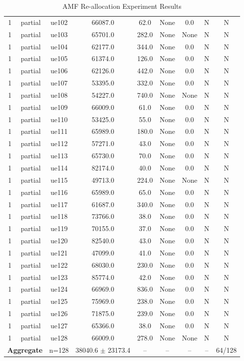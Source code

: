 \begin{table}[ht]
\begin{tabular}{|c|c|c|c|c|c|c|c|c|}
1 & partial & ue102 & 66087.0 & 62.0 & None & 0.0 & N & N \\
1 & partial & ue103 & 65701.0 & 282.0 & None & None & N & N \\
1 & partial & ue104 & 62177.0 & 344.0 & None & 0.0 & N & N \\
1 & partial & ue105 & 61374.0 & 126.0 & None & 0.0 & N & N \\
1 & partial & ue106 & 62126.0 & 442.0 & None & 0.0 & N & N \\
1 & partial & ue107 & 53395.0 & 332.0 & None & 0.0 & N & N \\
1 & partial & ue108 & 54227.0 & 740.0 & None & None & N & N \\
1 & partial & ue109 & 66009.0 & 61.0 & None & 0.0 & N & N \\
1 & partial & ue110 & 53425.0 & 55.0 & None & 0.0 & N & N \\
1 & partial & ue111 & 65989.0 & 180.0 & None & 0.0 & N & N \\
1 & partial & ue112 & 57271.0 & 43.0 & None & 0.0 & N & N \\
1 & partial & ue113 & 65730.0 & 70.0 & None & 0.0 & N & N \\
1 & partial & ue114 & 82174.0 & 40.0 & None & 0.0 & N & N \\
1 & partial & ue115 & 49713.0 & 224.0 & None & None & N & N \\
1 & partial & ue116 & 65989.0 & 65.0 & None & 0.0 & N & N \\
1 & partial & ue117 & 61687.0 & 340.0 & None & 0.0 & N & N \\
1 & partial & ue118 & 73766.0 & 38.0 & None & 0.0 & N & N \\
1 & partial & ue119 & 70155.0 & 37.0 & None & 0.0 & N & N \\
1 & partial & ue120 & 82540.0 & 43.0 & None & 0.0 & N & N \\
1 & partial & ue121 & 47099.0 & 41.0 & None & 0.0 & N & N \\
1 & partial & ue122 & 68030.0 & 230.0 & None & 0.0 & N & N \\
1 & partial & ue123 & 85774.0 & 42.0 & None & 0.0 & N & N \\
1 & partial & ue124 & 66969.0 & 836.0 & None & 0.0 & N & N \\
1 & partial & ue125 & 75969.0 & 238.0 & None & 0.0 & N & N \\
1 & partial & ue126 & 71875.0 & 239.0 & None & 0.0 & N & N \\
1 & partial & ue127 & 65366.0 & 38.0 & None & 0.0 & N & N \\
1 & partial & ue128 & 66009.0 & 278.0 & None & None & N & N \\
\multicolumn{2}{|c|}{\textbf{Aggregate}} & n=128 & 38040.6 $\pm$ 23173.4 & -- & -- & -- & -- & 64/128 \\
\hline
\end{tabular}
\caption{AMF Re-allocation Experiment Results}
\label{tab:amf_realloc}
\end{table}
